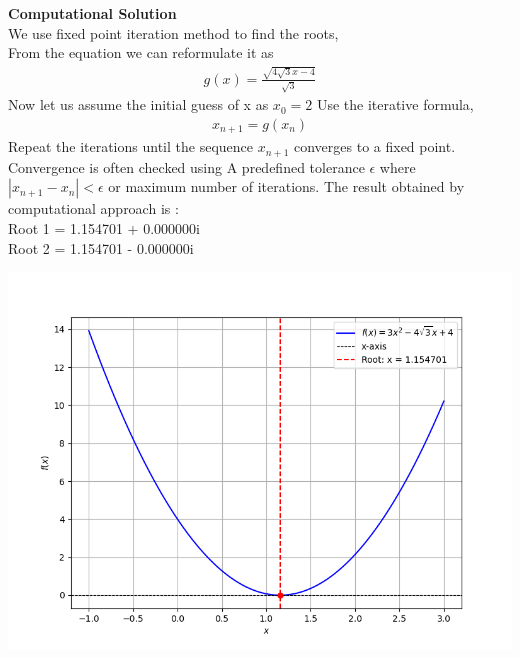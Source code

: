 \documentclass[journal]{IEEEtran}
\begin{document}
\textbf{Computational Solution}\\
We use fixed point iteration method to find the roots,\\
From the equation we can reformulate it as \\
\begin{align}
    g(x)=\frac{\sqrt{4{\sqrt{3}}x-4}}{\sqrt{3}}
\end{align}
Now let us assume the initial guess of x as $x_0=2$
Use the iterative formula,
\begin{align}
    x_{n+1}=g(x_n)
\end{align}
 Repeat the iterations until the sequence ${x_{n+1}}$ converges to a fixed point.
 Convergence is often checked using
A predefined tolerance $\epsilon$ where $|x_{n+1}-x_n|<\epsilon$ or maximum number of iterations.
The result obtained by computational approach is :\\
Root 1 = 1.154701 + 0.000000i\\
Root 2 = 1.154701 - 0.000000i
\begin{center}
    \includegraphics[width=0.75\columnwidth]{figs/eq.png}
\end{center}
\end{document}
